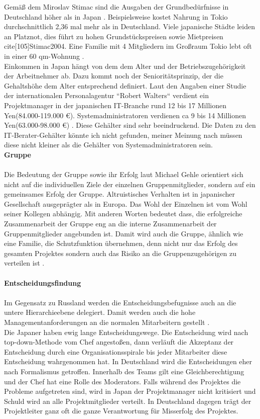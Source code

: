 		Gemäß dem Miroslav Stimac sind die Ausgaben der Grundbedürfnisse in Deutschland höher als in Japan \cite[101]{Stimac2004}.
		Beispielsweise kostet Nahrung in Tokio durchschnittlich 2,36 mal mehr als in Deutschland. Viele japanische Städte leiden an Platznot, dies führt zu hohen Grundstückspreisen sowie Mietpreisen \\cite[105]{Stimac2004}.
		Eine Familie mit 4 Mitgliedern im Großraum Tokio lebt oft in einer 60 qm-Wohnung \cite{ArbZeitJP}.\\	
		Einkommen in Japan hängt von dem dem Alter und der Betriebszugehörigkeit
		der Arbeitnehmer ab. Dazu kommt noch der Senioritätsprinzip, der die Gehaltshöhe dem Alter entsprechend definiert. Laut den Angaben  einer Studie der internationalen Personalagentur ``Robert Walters`` verdient ein Projektmanager in der japanischen IT-Branche rund 12 bis 17 Millionen Yen(84.000-119.000 €).
		Systemadministratoren verdienen ca 9 bis 14 Millionen Yen(63.000-98.000 €) \cite{EinkommenJP}.
		Diese Gehälter sind sehr beeindruckend. Die Daten zu den IT-Berater-Gehälter könnte ich nicht gefunden, meiner Meinung nach müssen diese nicht kleiner als die Gehälter von Systemadministratoren sein. \\
			\textbf{Gruppe}\\
			\\
		Die Bedeutung der Gruppe sowie ihr Erfolg laut Michael Gehle orientiert sich nicht auf die individuellen Ziele der	einzelnen Gruppenmitglieder, sondern auf ein gemeinsames Erfolg der Gruppe. Altruistisches Verhalten ist in japanischer Gesellschaft ausgeprägter als in Europa. Das Wohl der Einzelnen ist vom Wohl seiner Kollegen abhängig. Mit anderen Worten bedeutet dass, die erfolgreiche Zusammenarbeit der Gruppe eng an die interne Zusammenarbeit der Gruppenmitglieder angebunden  ist. Damit wird auch die Gruppe,  ähnlich wie eine Familie, die Schutzfunktion übernehmen, denn nicht nur das Erfolg des gesamten Projektes sondern auch das Risiko an die Gruppenzugehörigen zu verteilen ist \cite[233]{3LaenderVergl}.\\ \\
		\textbf{Entscheidungsfindung} \\ \\
		Im Gegensatz zu Russland werden die Entscheidungsbefugnisse auch an die untere Hierarchieebene delegiert. Damit werden auch die hohe Managementanforderungen  an die normalen Mitarbeitern gestellt \cite[233]{3LaenderVergl}.\\
		Die Japaner haben ewig lange Entscheidungswege. Die Entscheidung wird nach top-down-Methode vom Chef angestoßen, dann verläuft die Akzeptanz der Entscheidung durch eine Organisationsspirale bis jeder Mitarbeiter diese Entscheidung wahrgenommen hat. In Deutschland wird die Entscheidungen eher nach Formalismus getroffen. Innerhalb des Teams gilt eine Gleichberechtigung und der Chef hat eine Rolle des Moderators. Falls während des Projektes die Probleme aufgetreten sind, wird in Japan der Projektmanager nicht kritisiert und Schuld wird an alle Projektmitglieder verteilt. In Deutschland dagegen trägt der Projektleiter ganz oft die ganze Verantwortung für Misserfolg des Projektes.
